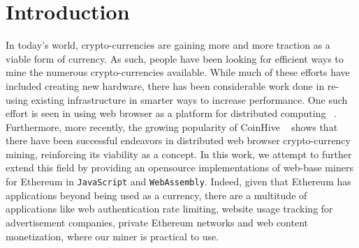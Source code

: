 \documentclass[runningheads]{llncs}
\begin{document}
\section{Introduction}
In today's world, crypto-currencies are gaining more and more traction as a viable form of currency. As such, people have been looking for efficient ways to mine the numerous crypto-currencies available. While much of these efforts have included creating new hardware, there has been considerable work done in re-using existing infrastructure in smarter ways to increase performance. One such effort is seen in using web browser as a platform for distributed computing ~\cite{Cushing}. Furthermore, more recently, the growing popularity of CoinHive ~\cite{coinhive} shows that there have been successful endeavors in distributed web browser crypto-currency mining, reinforcing its viability as a concept. In this work, we attempt to further extend this field by providing an open\-source implementations of web-base miners for Ethereum in \verb|JavaScript| and \verb|WebAssembly|. Indeed, given that Ethereum has applications beyond being used as a currency, there are a multitude of applications like web authentication rate limiting, website usage tracking for advertisement companies, private Ethereum networks and web content monetization, where our miner is practical to use.
\end{document}
